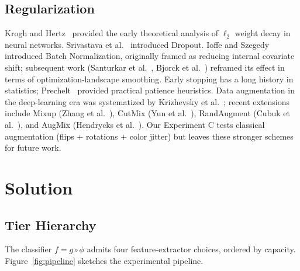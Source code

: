 \documentclass[10pt,letterpaper]{article}
\begin{document}
\subsection{Regularization}
Krogh and Hertz~\cite{krogh1992} provided the early theoretical analysis of $\ell_2$ weight decay in neural networks. Srivastava et al.~\cite{dropout2014} introduced Dropout. Ioffe and Szegedy~\cite{batchnorm2015} introduced Batch Normalization, originally framed as reducing internal covariate shift; subsequent work (Santurkar et al.~\cite{santurkar2018}, Bjorck et al.~\cite{bjorck2018}) reframed its effect in terms of optimization-landscape smoothing. Early stopping has a long history in statistics; Prechelt~\cite{prechelt1998} provided practical patience heuristics. Data augmentation in the deep-learning era was systematized by Krizhevsky et al.~\cite{alexnet2012}; recent extensions include Mixup (Zhang et al.~\cite{mixup2018}), CutMix (Yun et al.~\cite{cutmix2019}), RandAugment (Cubuk et al.~\cite{randaugment2020}), and AugMix (Hendrycks et al.~\cite{augmix2020}). Our Experiment C tests classical augmentation (flips + rotations + color jitter) but leaves these stronger schemes for future work.

\section{Solution}
\label{sec:solution}

\subsection{Tier Hierarchy}
The classifier $f = g \circ \phi$ admits four feature-extractor choices, ordered by capacity. Figure~\ref{fig:pipeline} sketches the experimental pipeline.
\end{document}
